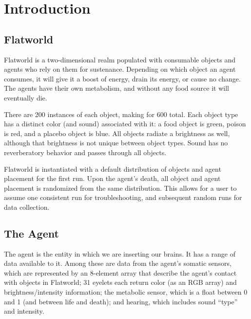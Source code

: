 \section{Introduction} \label{sec:Introduction}



\subsection{Flatworld}
Flatworld is a two-dimensional realm populated with consumable objects
and agents who rely on them for sustenance. Depending on which object
an agent consumes, it will give it a boost of energy, drain its energy,
or cause no change. The agents have their own metabolism, and without any food
source it will eventually die.

There are 200 instances of each object, making for 600 total. Each object type
has a distinct color (and sound) associated with it: a food object is green, 
poison is red, and a placebo object is blue. All objects radiate a brightness 
as well, although that brightness is not unique between object types. Sound 
has no reverberatory behavior and passes through all objects.

Flatworld is instantiated with a default distribution of objects and agent
placement for the first run. Upon the agent's death, all object and agent
placement is randomized from the same distribution. This allows for a user
to assume one consistent run for troubleshooting, and subsequent random
runs for data collection.


\subsection{The Agent}
The agent is the entity in which we are inserting our brains. It has a range
of data available to it. Among these are data from the agent's somatic
sensors, which are represented by an 8-element array that describe the agent's
contact with objects in Flatworld; 31 eyelets each return color (as an RGB 
array) and brightness/intensity information; the metabolic sensor, which
is a float between 0 and 1 (and between life and death); and hearing, which
includes sound ``type'' and intensity.

